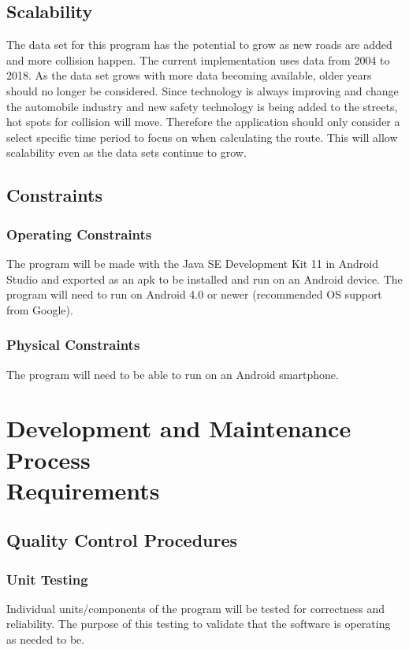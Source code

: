 \documentclass[12pt]{article}
\begin{document}
\newpage
\subsection{Scalability}
The data set for this program has the potential to grow as new roads are added and more collision happen. The current implementation uses data from 2004 to 2018. As the data set grows with more data becoming available, older years should no longer be considered. Since technology is always improving and change the automobile industry and new safety technology is being added to the streets, hot spots for collision will move. Therefore the application should only consider a select specific time period to focus on when calculating the route. This will allow scalability even as the data sets continue to grow.

\subsection{Constraints}
    \subsubsection{Operating Constraints}
    The program will be made with the Java SE Development Kit 11 in Android Studio and exported as an apk to be installed and run on an Android device. The program will need to run on Android 4.0 or newer (recommended OS support from Google).
    
    \subsubsection{Physical Constraints}
    The program will need to be able to run on an Android smartphone.

\section{\texorpdfstring{Development and Maintenance Process \\Requirements}{Development and Maintenance Process Requirements}}

\subsection{Quality Control Procedures}
    \subsubsection{Unit Testing}
    Individual units/components of the program will be tested for correctness and reliability. The purpose of this testing to validate that the software is operating as needed to be.
    
\end{document}
